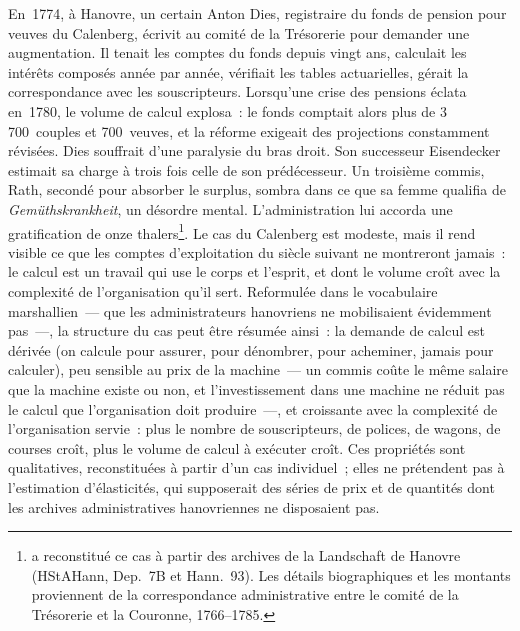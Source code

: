En~1774, à Hanovre, un certain Anton Dies, registraire du fonds de pension pour veuves du Calenberg, écrivit au comité de la Trésorerie pour demander une augmentation. Il tenait les comptes du fonds depuis vingt ans, calculait les intérêts composés année par année, vérifiait les tables actuarielles, gérait la correspondance avec les souscripteurs. Lorsqu'une crise des pensions éclata en~1780, le volume de calcul explosa~: le fonds comptait alors plus de 3\,700~couples et 700~veuves, et la réforme exigeait des projections constamment révisées. Dies souffrait d'une paralysie du bras droit. Son successeur Eisendecker estimait sa charge à trois fois celle de son prédécesseur. Un troisième commis, Rath, secondé pour absorber le surplus, sombra dans ce que sa femme qualifia de \og \emph{Gemüthskrankheit}\fg{}, un désordre mental. L'administration lui accorda une gratification de onze thalers\footnote{\textcite{rosenhaft_hands_2003} a reconstitué ce cas à partir des archives de la Landschaft de Hanovre (HStAHann, Dep.~7B et Hann.~93). Les détails biographiques et les montants proviennent de la correspondance administrative entre le comité de la Trésorerie et la Couronne, 1766--1785.}. %
Le cas du Calenberg est modeste, mais il rend visible ce que les comptes d'exploitation du siècle suivant ne montreront jamais~: le calcul est un travail qui use le corps et l'esprit, et dont le volume croît avec la complexité de l'organisation qu'il sert. Reformulée dans le vocabulaire marshallien~--- que les administrateurs hanovriens ne mobilisaient évidemment pas~---, la structure du cas peut être résumée ainsi~: la demande de calcul est dérivée (on calcule pour assurer, pour dénombrer, pour acheminer, jamais pour calculer), peu sensible au prix de la machine~--- un commis coûte le même salaire que la machine existe ou non, et l'investissement dans une machine ne réduit pas le calcul que l'organisation doit produire~---, et croissante avec la complexité de l'organisation servie~: plus le nombre de souscripteurs, de polices, de wagons, de courses croît, plus le volume de calcul à exécuter croît. Ces propriétés sont qualitatives, reconstituées à partir d'un cas individuel~; elles ne prétendent pas à l'estimation d'élasticités, qui supposerait des séries de prix et de quantités dont les archives administratives hanovriennes ne disposaient pas. %
